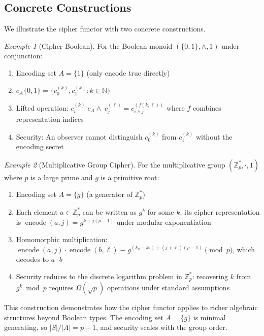 \documentclass[11pt]{article}
\theoremstyle{definition}
\theoremstyle{plain}
\theoremstyle{remark}
\newtheorem{example}{Example}[section]
\newcommand{\cipher}[1]{c_{#1}}
\newcommand{\encode}{\operatorname{encode}}
\begin{document}
\subsection{Concrete Constructions}
\label{subsec:concrete}

We illustrate the cipher functor with two concrete constructions.

\begin{example}[Cipher Boolean]
\label{ex:cipher-bool}
For the Boolean monoid $(\{0,1\}, \land, 1)$ under conjunction:
\begin{enumerate}
\item Encoding set $A = \{1\}$ (only encode true directly)
\item $\cipher{A}\{0,1\} = \{c_0^{(k)}, c_1^{(k)} : k \in \mathbb{N}\}$
\item Lifted operation: $c_i^{(k)} \;\cipher{A}\!\land\; c_j^{(\ell)} = c_{i \land j}^{(f(k,\ell))}$ where $f$ combines representation indices
\item Security: An observer cannot distinguish $c_0^{(k)}$ from $c_1^{(k)}$ without the encoding secret
\end{enumerate}
\end{example}

\begin{example}[Multiplicative Group Cipher]
\label{ex:cyclic-cipher}
For the multiplicative group $(\mathbb{Z}_p^*, \cdot, 1)$ where $p$ is a large prime and $g$ is a primitive root:
\begin{enumerate}
\item Encoding set $A = \{g\}$ (a generator of $\mathbb{Z}_p^*$)
\item Each element $a \in \mathbb{Z}_p^*$ can be written as $g^k$ for some $k$; its cipher representation is $\encode(a, j) = g^{k + j(p-1)}$ under modular exponentiation
\item Homomorphic multiplication: $\encode(a, j) \cdot \encode(b, \ell) \equiv g^{(k_a + k_b) + (j+\ell)(p-1)} \pmod{p}$, which decodes to $a \cdot b$
\item Security reduces to the discrete logarithm problem in $\mathbb{Z}_p^*$: recovering $k$ from $g^k \bmod p$ requires $\Omega(\sqrt{p})$ operations under standard assumptions~\cite{elgamal1985public}
\end{enumerate}
This construction demonstrates how the cipher functor applies to richer algebraic structures beyond Boolean types. The encoding set $A = \{g\}$ is minimal generating, so $|S|/|A| = p - 1$, and security scales with the group order.
\end{example}
\end{document}
